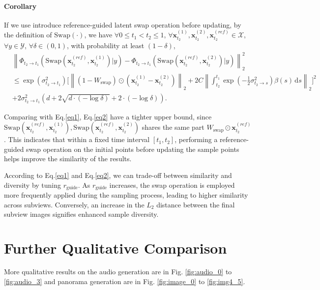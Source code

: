 \paragraph{Corollary}
If we use introduce reference-guided latent swap operation before updating, by the definition of $\text{Swap}(\cdot)$, we have $\forall 0\leq t_1 < t_2 \leq 1$, $\forall \mathbf{x}_{t_2}^{(1)}, \mathbf{x}_{t_2}^{(2)}, \mathbf{x}_{t_2}^{(ref)} \in \mathcal{X}$, $\forall y\in \mathcal{Y}$, $\forall \delta\in(0,1)$, with probability at least $(1-\delta)$, 
\begin{equation}
\begin{aligned}
\label{eq2}
   & \left\| \Phi_{t_2\rightarrow t_1}\left(\text{Swap}(\mathbf{x}_{t_2}^{(ref)},\mathbf{x}_{t_2}^{(1)}) \vert y\right) 
    -\Phi_{t_2\rightarrow t_1}\left(\text{Swap}(\mathbf{x}_{t_2}^{(ref)},\mathbf{x}_{t_2}^{(2)}) \vert y\right) \right\|_2^2
\\& \leq   \exp\left(\sigma^2_{t_2 \rightarrow t_1}\right) 
    \Bigg[ \left\|(1-W_{\textrm{swap}})\odot(\mathbf{x}_{t_2}^{(1)}-\mathbf{x}_{t_2}^{(2)})\right\|_2   + 2C \left\| \int_{t_2}^{t_1} \exp\left(-\frac{1}{2} \sigma^2_{t_2 \rightarrow s}\right) 
    \beta(s) \,\textrm{d}s \right\|_2 \Bigg]^2  \\ 
    & + 2\sigma^2_{t_2 \rightarrow t_1} 
    \left( d + 2\sqrt{d \cdot (-\log\delta)} + 2 \cdot (-\log\delta) \right).
\end{aligned}
\end{equation}



Comparing with Eq.\ref{eq1}, Eq.\ref{eq2} have a tighter upper bound, since $\text{Swap}(\mathbf{x}_{t_2}^{(ref)},\mathbf{x}_{t_2}^{(1)}),\text{Swap}(\mathbf{x}_{t_2}^{(ref)},\mathbf{x}_{t_2}^{(2)})$ shares the same part $W_{\textrm{swap}}\odot\mathbf{x}_{t_2}^{(ref)}$. This indicates that within a fixed time interval $[t_1, t_2]$, performing a reference-guided swap operation on the initial points before updating the sample points helps improve the similarity of the results. 

According to Eq.\ref{eq1} and Eq.\ref{eq2}, we can trade-off between similarity and diversity by tuning $r_\text{guide}$. As $r_\text{guide}$ increases, the swap operation is employed more frequently applied during the sampling process, leading to higher similarity across subviews. Conversely, an increase in the $L_2$ distance between the final subview images signifies enhanced sample diversity.

\section{Further Qualitative Comparison}
\label{sec:qual}
More qualitative results on the audio generation are in Fig. \ref{fig:audio_0} to \ref{fig:audio_3} and panorama generation are in Fig. \ref{fig:image_0} to \ref{fig:img4_5}.

